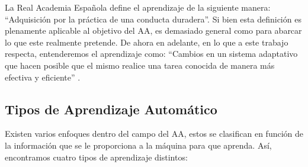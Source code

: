 La Real Academia Española define el aprendizaje de la siguiente manera: ``Adquisición por la práctica de una conducta duradera''. Si bien esta definición es plenamente aplicable al objetivo del \acs{AA}, es demasiado general como para abarcar lo que este realmente pretende. De ahora en adelante, en lo que a este trabajo respecta, entenderemos el aprendizaje como: ``Cambios en un sistema adaptativo que hacen posible que el mismo realice una tarea conocida de manera más efectiva y eficiente'' \cite{Michalski:2013}.

\subsection{Tipos de Aprendizaje Automático}

Existen varios enfoques dentro del campo del \acs{AA}, estos se clasifican en función de la información que se le proporciona a la máquina para que aprenda. Así, encontramos cuatro tipos de aprendizaje distintos: 

